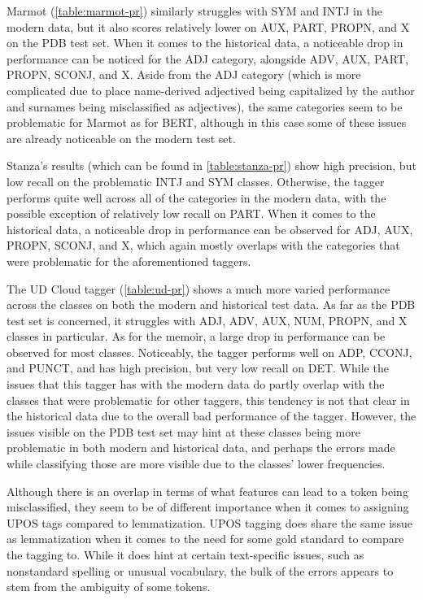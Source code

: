 Marmot (\autoref{table:marmot-pr}) similarly struggles with SYM and INTJ in the modern data, but it also scores relatively lower on AUX, PART, PROPN, and X on the PDB test set. When it comes to the historical data, a noticeable drop in performance can be noticed for the ADJ category, alongside ADV, AUX, PART, PROPN, SCONJ, and X. Aside from the ADJ category (which is more complicated due to place name-derived adjectived being capitalized by the author and surnames being misclassified as adjectives), the same categories seem to be problematic for Marmot as for BERT, although in this case some of these issues are already noticeable on the modern test set.

Stanza's results (which can be found in \autoref{table:stanza-pr}) show high precision, but low recall on the problematic INTJ and SYM classes. Otherwise, the tagger performs quite well across all of the categories in the modern data, with the possible exception of relatively low recall on PART. When it comes to the historical data, a noticeable drop in performance can be observed for ADJ, AUX, PROPN, SCONJ, and X, which again mostly overlaps with the categories that were problematic for the aforementioned taggers.

The UD Cloud tagger (\autoref{table:ud-pr}) shows a much more varied performance across the classes on both the modern and historical test data. As far as the PDB test set is concerned, it struggles with ADJ, ADV, AUX, NUM, PROPN, and X classes in particular. As for the memoir, a large drop in performance can be observed for most classes. Noticeably, the tagger performs well on ADP, CCONJ, and PUNCT, and has high precision, but very low recall on DET. While the issues that this tagger has with the modern data do partly overlap with the classes that were problematic for other taggers, this tendency is not that clear in the historical data due to the overall bad performance of the tagger. However, the issues visible on the PDB test set may hint at these classes being more problematic in both modern and historical data, and perhaps the errors made while classifying those are more visible due to the classes' lower frequencies.

Although there is an overlap in terms of what features can lead to a token being misclassified, they seem to be of different importance when it comes to assigning UPOS tags compared to lemmatization. UPOS tagging does share the same issue as lemmatization when it comes to the need for some gold standard to compare the tagging to. While it does hint at certain text-specific issues, such as nonstandard spelling or unusual vocabulary, the bulk of the errors appears to stem from the ambiguity of some tokens.

